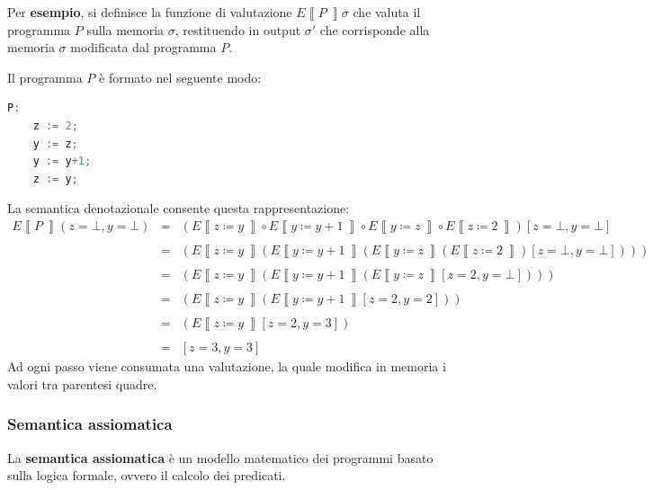 \documentclass[a4paper]{article}
\newcommand{\exec}[1]{\left\llbracket #1\:\right\rrbracket}
\begin{document}
	\noindent
	Per \textcolor{Green4}{\textbf{esempio}}, si definisce la funzione di valutazione $E\exec{P}\sigma$ che valuta il programma $P$ sulla memoria $\sigma$, restituendo in output $\sigma'$ che corrisponde alla memoria $\sigma$ modificata dal programma $P$.\newline
	
	\noindent
	Il programma $P$ è formato nel seguente modo:
\begin{lstlisting}[language=C]
P:
	z := 2;
	y := z;
	y := y+1;
	z := y;\end{lstlisting}
	La semantica denotazionale consente questa rappresentazione:
	\begin{equation*}
		\begin{array}{lll}
			E\exec{P}\left(z = \bot, y = \bot\right) & = & \left(E\exec{ z \coloneq y } \circ E\exec{ y \coloneq y+1 } \circ E\exec{ y \coloneq z } \circ E\exec{ z \coloneq 2 }\right) \left[z = \bot, y = \bot\right] \\
			\\
			&=& \left(E\exec{ z \coloneq y } \left( E\exec{ y \coloneq y+1 } \left( E\exec{ y \coloneq z } \left( E\exec{ z \coloneq 2 } \right) \left[z = \bot, y = \bot\right]\right)\right)\right) \\
			\\
			&=& \left(E\exec{ z \coloneq y } \left( E\exec{ y \coloneq y+1 } \left( E\exec{ y \coloneq z } \left[z = 2, y = \bot\right]\right)\right)\right) \\
			\\
			&=& \left(E\exec{ z \coloneq y } \left( E\exec{ y \coloneq y+1 } \left[z = 2, y = 2\right]\right)\right) \\
			\\
			&=& \left(E\exec{ z \coloneq y } \left[z = 2, y = 3\right]\right) \\
			\\
			&=& \left[z = 3, y = 3\right]
		\end{array}
	\end{equation*}
	Ad ogni passo viene consumata una valutazione, la quale modifica in memoria i valori tra parentesi quadre.\newpage
	
	\subsubsection{Semantica assiomatica}
	
	\begin{boxdef}
		La \textcolor{Red3}{\textbf{semantica assiomatica}} è un modello matematico dei programmi basato sulla logica formale, ovvero il calcolo dei predicati.
	\end{boxdef}
	
\end{document}

